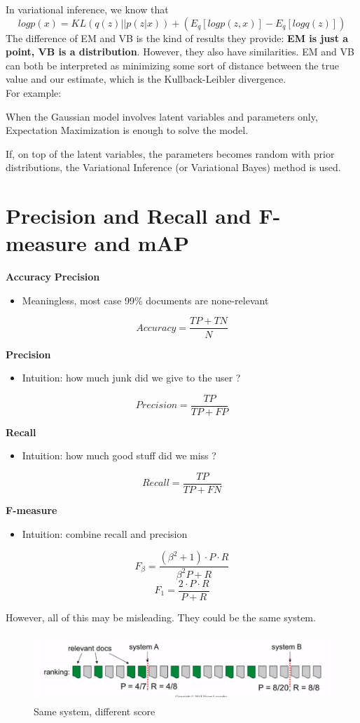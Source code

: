 \documentclass{article}
\begin{document}
\begin{CJK*}{UTF8}{gbsn}
In variational inference, we know that 
$$logp(x)=KL(q(z)||p(z|x))+(E_{q}[logp(z,x)]-E_{q}[logq(z)])$$
The difference of EM and VB is the kind of results they provide: \textbf{EM is just a point, VB is a distribution}. However, they also have similarities. EM and VB can both be interpreted as minimizing some sort of distance between the true value and our estimate, which is the Kullback-Leibler divergence. \\
For example:

When the Gaussian model involves latent variables and parameters only, Expectation Maximization is enough to solve the model. 

If, on top of the latent variables, the parameters becomes random with prior distributions, the Variational Inference (or Variational Bayes) method is used.

\section{Precision and Recall and F-measure and mAP}

\textbf{Accuracy}
\textbf{Precision}
\begin{itemize}
\item Meaningless, most case 99\% documents are none-relevant
\end{itemize}
$$Accuracy=\frac{TP+TN}{N}$$

\textbf{Precision}
\begin{itemize}
\item Intuition: how much junk did we give to the user ?
\end{itemize}
$$Precision=\frac{TP}{TP+FP}$$

\textbf{Recall}
\begin{itemize}
\item Intuition: how much good stuff did we miss ?
\end{itemize}
$$Recall=\frac{TP}{TP+FN}$$

\textbf{F-measure}
\begin{itemize}
\item Intuition: combine recall and precision
\end{itemize}
$$F_{\beta}=\frac{(\beta^{2}+1) \cdot P \cdot R}{\beta^{2}P+R}$$
$$F_{1}=\frac{2 \cdot P \cdot R}{P+R}$$

However, all of this may be misleading. They could be the same system.
\begin{figure}[H]
\centering
\includegraphics[width=5in,height=1in]{eval}
\caption{Same system, different score}
\end{figure}


\end{CJK*}
\end{document}
